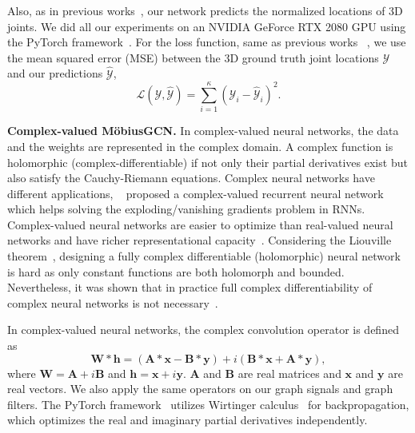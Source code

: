 \documentclass[runningheads]{llncs}
\begin{document}
Also, as in previous works~\cite{martinez2017simple, zhaoCVPR19semantic, pavlakos2017coarse, liu2020comprehensive}, our network predicts the normalized locations of 3D joints. We did all our experiments on an NVIDIA GeForce RTX 2080 GPU using the PyTorch framework~\cite{NEURIPS2019_9015}.
For the loss function, same as previous works \emph{\eg}~\cite{martinez2017simple, pavllo20193d}, we use the mean squared error (MSE) between the 3D ground truth joint locations $\mathcal{Y}$ and our predictions $\mathcal{\hat{Y}}$, \ie
\begin{equation}
    \mathcal{L}(\mathcal{Y}, \mathcal{\hat{Y}}) = \sum_{i=1}^{\kappa}(\mathcal{Y}_i-\mathcal{\hat{Y}}_i)^2.
\end{equation}


\textbf{Complex-valued M\"obiusGCN.} In complex-valued neural networks, the data and the weights are represented in the complex domain. A complex function is holomorphic (complex-differentiable) if not only their partial derivatives exist but also satisfy the Cauchy-Riemann equations. Complex neural networks have different applications, \eg~\citet{wolter2018complex} proposed a complex-valued recurrent neural network which helps solving the exploding/vanishing gradients problem in RNNs. 
Complex-valued neural networks are easier to optimize than real-valued neural networks and have richer representational capacity~\cite{trabelsi2018deep}. Considering the Liouville theorem~\cite{mandic2009complex}, designing a fully complex differentiable (holomorphic) neural network is hard as only constant functions are both holomorph and bounded. Nevertheless, it was shown that in practice full complex differentiability of complex neural networks is not necessary~\cite{trabelsi2018deep}.

In complex-valued neural networks, the complex convolution operator is defined as 
\begin{equation*}
    \mathbf{W} \ast \mathbf{h} = (\mathbf{A} \ast \mathbf{x} - \mathbf{B} \ast \mathbf{y}) + i(\mathbf{B} \ast \mathbf{x} + \mathbf{A} \ast \mathbf{y}),
\end{equation*}
where $\mathbf{W} = \mathbf{A} + i\mathbf{B}$ and $\mathbf{h} = \mathbf{x} + i\mathbf{y}$. $\mathbf{A}$ and $\mathbf{B}$ are real matrices and $\mathbf{x}$ and $\mathbf{y}$ are real vectors. 
We also apply the same operators on our graph signals and graph filters.
The PyTorch framework~\cite{NEURIPS2019_9015} utilizes Wirtinger calculus~\cite{kreutz2009complex} for backpropagation, which  optimizes the real and imaginary partial derivatives independently. 
\end{document}

